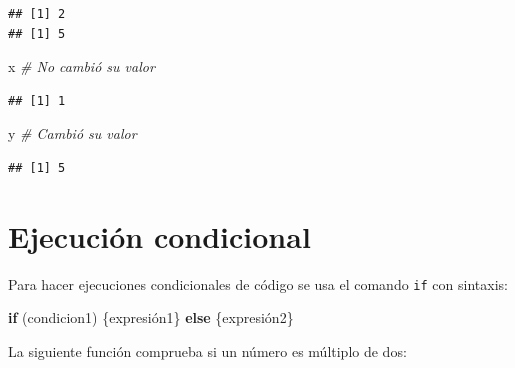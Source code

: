 \documentclass[]{book}
\newenvironment{Shaded}{\begin{snugshade}}{\end{snugshade}}
\newcommand{\CommentTok}[1]{\textcolor[rgb]{0.56,0.35,0.01}{\textit{#1}}}
\newcommand{\ControlFlowTok}[1]{\textcolor[rgb]{0.13,0.29,0.53}{\textbf{#1}}}
\newcommand{\DecValTok}[1]{\textcolor[rgb]{0.00,0.00,0.81}{#1}}
\newcommand{\KeywordTok}[1]{\textcolor[rgb]{0.13,0.29,0.53}{\textbf{#1}}}
\newcommand{\NormalTok}[1]{#1}
\newcommand{\OperatorTok}[1]{\textcolor[rgb]{0.81,0.36,0.00}{\textbf{#1}}}
\newcommand{\StringTok}[1]{\textcolor[rgb]{0.31,0.60,0.02}{#1}}
\begin{document}
\begin{verbatim}
## [1] 2
## [1] 5
\end{verbatim}

\begin{Shaded}
\begin{Highlighting}[]
\NormalTok{x }\CommentTok{# No cambió su valor}
\end{Highlighting}
\end{Shaded}

\begin{verbatim}
## [1] 1
\end{verbatim}

\begin{Shaded}
\begin{Highlighting}[]
\NormalTok{y }\CommentTok{# Cambió su valor}
\end{Highlighting}
\end{Shaded}

\begin{verbatim}
## [1] 5
\end{verbatim}

\hypertarget{ejecucion-condicional}{%
\section{Ejecución condicional}\label{ejecucion-condicional}}

Para hacer ejecuciones
condicionales de código se usa el comando \texttt{if} con sintaxis:

\begin{Shaded}
\begin{Highlighting}[]
\ControlFlowTok{if}\NormalTok{ (condicion1) \{expresión1\} }\ControlFlowTok{else}\NormalTok{ \{expresión2\}}
\end{Highlighting}
\end{Shaded}

La siguiente función comprueba si un número es múltiplo de dos:

\begin{Shaded}
\end{Shaded}
\end{document}
